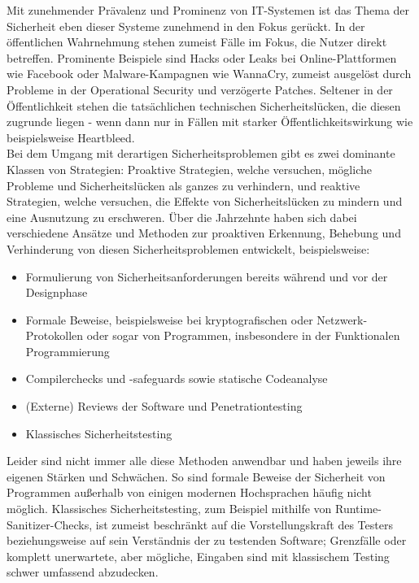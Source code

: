 \documentclass[a4paper]{article}
\begin{document}
Mit zunehmender Prävalenz und Prominenz von IT-Systemen ist das Thema der Sicherheit eben dieser Systeme zunehmend in den Fokus gerückt. 
In der öffentlichen Wahrnehmung stehen zumeist Fälle im Fokus, die Nutzer direkt betreffen. 
Prominente Beispiele sind Hacks oder Leaks bei Online-Plattformen wie Facebook\cite{facebook} oder Malware-Kampagnen wie WannaCry\cite{ransomware}, zumeist ausgelöst durch Probleme in der Operational Security und verzögerte Patches.
Seltener in der Öffentlichkeit stehen die tatsächlichen technischen Sicherheitslücken, die diesen zugrunde liegen - wenn dann nur in Fällen mit starker Öffentlichkeitswirkung wie beispielsweise Heartbleed\cite{heartbleed}.\\
Bei dem Umgang mit derartigen Sicherheitsproblemen gibt es zwei dominante Klassen von Strategien: Proaktive Strategien, welche versuchen, mögliche Probleme und Sicherheitslücken als ganzes zu verhindern, und reaktive Strategien, welche versuchen, die Effekte von Sicherheitslücken zu mindern und eine Ausnutzung zu erschweren.
Über die Jahrzehnte haben sich dabei verschiedene Ansätze und Methoden zur proaktiven Erkennung, Behebung und Verhinderung von diesen Sicherheitsproblemen entwickelt, beispielsweise\cite{securitymethods}:
\begin{itemize}
\item Formulierung von Sicherheitsanforderungen bereits während und vor der Designphase
\item Formale Beweise, beispielsweise bei kryptografischen oder Netzwerk-Protokollen oder sogar von Programmen, insbesondere in der Funktionalen Programmierung
\item Compilerchecks und -safeguards sowie statische Codeanalyse
\item (Externe) Reviews der Software und Penetrationtesting
\item Klassisches Sicherheitstesting
\end{itemize}
Leider sind nicht immer alle diese Methoden anwendbar und haben jeweils ihre eigenen Stärken und Schwächen. So sind formale Beweise der Sicherheit von Programmen außerhalb von einigen modernen Hochsprachen häufig nicht möglich. Klassisches Sicherheitstesting, zum Beispiel mithilfe von Runtime-Sanitizer-Checks, ist zumeist beschränkt auf die Vorstellungskraft des Testers beziehungsweise auf sein Verständnis der zu testenden Software; Grenzfälle oder komplett unerwartete, aber mögliche, Eingaben sind mit klassischem Testing schwer umfassend abzudecken.\\
\end{document}
